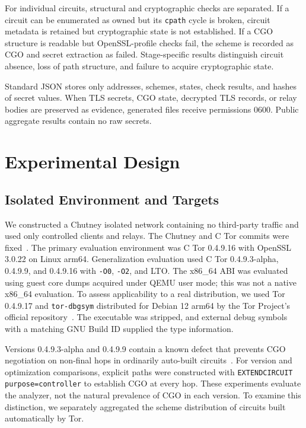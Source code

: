 \documentclass[10pt,a4paper]{article}
\newcommand{\code}[1]{\nolinkurl{#1}}
\begin{document}
For individual circuits, structural and cryptographic checks are separated. If a circuit can be enumerated as owned but its \code{cpath} cycle is broken, circuit metadata is retained but cryptographic state is not established. If a CGO structure is readable but OpenSSL-profile checks fail, the scheme is recorded as CGO and secret extraction as failed. Stage-specific results distinguish circuit absence, loss of path structure, and failure to acquire cryptographic state.

Standard JSON stores only addresses, schemes, states, check results, and hashes of secret values. When TLS secrets, CGO state, decrypted TLS records, or relay bodies are preserved as evidence, generated files receive permissions 0600. Public aggregate results contain no raw secrets.

\section{Experimental Design}\label{sec:experiment}

\subsection{Isolated Environment and Targets}

We constructed a Chutney isolated network containing no third-party traffic and used only controlled clients and relays. The Chutney and C Tor commits were fixed~\cite{chutneysource,ctorsource04916}.
The primary evaluation environment was C Tor 0.4.9.16 with OpenSSL 3.0.22 on Linux arm64.
Generalization evaluation used C Tor 0.4.9.3-alpha, 0.4.9.9, and 0.4.9.16 with \code{-O0}, \code{-O2}, and LTO.
The x86\_64 ABI was evaluated using guest core dumps acquired under QEMU user mode; this was not a native x86\_64 evaluation.
To assess applicability to a real distribution, we used Tor 0.4.9.17 and \code{tor-dbgsym} distributed for Debian 12 arm64 by the Tor Project's official repository~\cite{torpackage04917}. The executable was stripped, and external debug symbols with a matching GNU Build ID supplied the type information.

Versions 0.4.9.3-alpha and 0.4.9.9 contain a known defect that prevents CGO negotiation on non-final hops in ordinarily auto-built circuits~\cite{torrelease04912}. For version and optimization comparisons, explicit paths were constructed with \code{EXTENDCIRCUIT purpose=controller} to establish CGO at every hop. These experiments evaluate the analyzer, not the natural prevalence of CGO in each version. To examine this distinction, we separately aggregated the scheme distribution of circuits built automatically by Tor.
\end{document}
